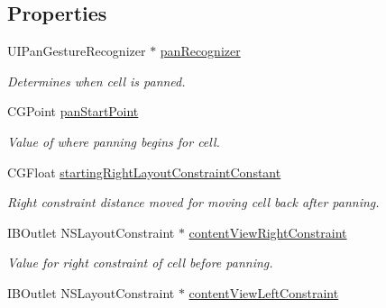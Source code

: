 \subsection*{Properties}
\begin{DoxyCompactItemize}
\item 
\hypertarget{category_invitation_table_view_cell_07_08_a8d94b589a02c491b2eb82674f03a7c34}{U\+I\+Pan\+Gesture\+Recognizer $\ast$ \hyperlink{category_invitation_table_view_cell_07_08_a8d94b589a02c491b2eb82674f03a7c34}{pan\+Recognizer}}\label{category_invitation_table_view_cell_07_08_a8d94b589a02c491b2eb82674f03a7c34}

\begin{DoxyCompactList}\small\item\em Determines when cell is panned. \end{DoxyCompactList}\item 
\hypertarget{category_invitation_table_view_cell_07_08_ac783d146709d70a85f2b51b8f0f0efda}{C\+G\+Point \hyperlink{category_invitation_table_view_cell_07_08_ac783d146709d70a85f2b51b8f0f0efda}{pan\+Start\+Point}}\label{category_invitation_table_view_cell_07_08_ac783d146709d70a85f2b51b8f0f0efda}

\begin{DoxyCompactList}\small\item\em Value of where panning begins for cell. \end{DoxyCompactList}\item 
\hypertarget{category_invitation_table_view_cell_07_08_a71ac2ce59159c2dab58af8777e649c5f}{C\+G\+Float \hyperlink{category_invitation_table_view_cell_07_08_a71ac2ce59159c2dab58af8777e649c5f}{starting\+Right\+Layout\+Constraint\+Constant}}\label{category_invitation_table_view_cell_07_08_a71ac2ce59159c2dab58af8777e649c5f}

\begin{DoxyCompactList}\small\item\em Right constraint distance moved for moving cell back after panning. \end{DoxyCompactList}\item 
\hypertarget{category_invitation_table_view_cell_07_08_a96f55e0853bbbb145b90f3d8df5a07e0}{I\+B\+Outlet N\+S\+Layout\+Constraint $\ast$ \hyperlink{category_invitation_table_view_cell_07_08_a96f55e0853bbbb145b90f3d8df5a07e0}{content\+View\+Right\+Constraint}}\label{category_invitation_table_view_cell_07_08_a96f55e0853bbbb145b90f3d8df5a07e0}

\begin{DoxyCompactList}\small\item\em Value for right constraint of cell before panning. \end{DoxyCompactList}\item 
\hypertarget{category_invitation_table_view_cell_07_08_a2cb0b06035f60241b716ed952358be99}{I\+B\+Outlet N\+S\+Layout\+Constraint $\ast$ \hyperlink{category_invitation_table_view_cell_07_08_a2cb0b06035f60241b716ed952358be99}{content\+View\+Left\+Constraint}}\label{category_invitation_table_view_cell_07_08_a2cb0b06035f60241b716ed952358be99}


\end{DoxyCompactItemize}
